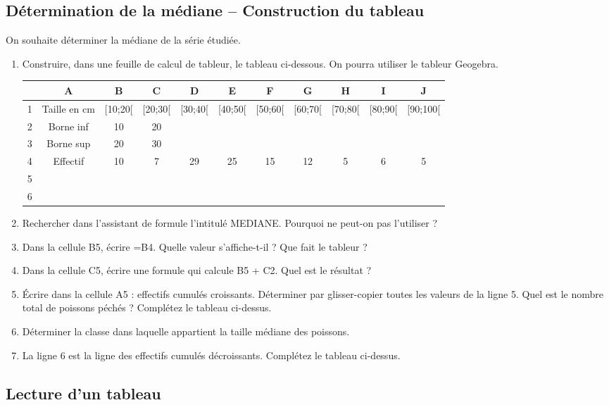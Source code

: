 \subsection*{Détermination de la médiane – Construction du tableau}
On souhaite déterminer la médiane de la série étudiée.
\begin{enumerate}
\item Construire, dans une feuille de calcul de tableur, le tableau ci-dessous. On pourra utiliser le tableur Geogebra.

\begin{tabular}{|c|c|c|c|c|c|c|c|c|c|c|}
\hline
\rowcolor{gray}&A &B &C &D& E &F &G &H& I& J\\
\hline
\cellcolor{gray}1& Taille en cm& [10;20[& [20;30[ &[30;40[ &[40;50[& [50;60[& [60;70[ &[70;80[ &[80;90[& [90;100[\\
\hline
\cellcolor{gray}2& Borne inf& 10& 20&&&&&&&\\
\hline
\cellcolor{gray}3& Borne sup &20& 30&&&&&&&\\
\hline
\cellcolor{gray}4& Effectif &10& 7& 29& 25& 15& 12 &5 &6& 5\\
\hline
\cellcolor{gray}5 &&&&&&&&&&\\
\hline
\cellcolor{gray}6 &&&&&&&&&&\\
\hline
\end{tabular}
\item Rechercher dans l'assistant de formule l'intitulé MEDIANE. Pourquoi ne peut-on pas l'utiliser ?
\item Dans la cellule B5, écrire =B4. Quelle valeur s'affiche-t-il ? Que fait le tableur ?
\item Dans la cellule C5, écrire une formule qui calcule B5 + C2. Quel est le résultat ?
\item Écrire dans la cellule A5 : effectifs cumulés croissants. Déterminer par glisser-copier toutes les
valeurs de la ligne 5. Quel est le nombre total de poissons péchés ? Complétez le tableau ci-dessus.
\item Déterminer la classe dans laquelle appartient la taille médiane des poissons.
\item La ligne 6 est la ligne des effectifs cumulés décroissants. Complétez le tableau ci-dessus.

\end{enumerate}


\subsection*{Lecture d'un tableau}

